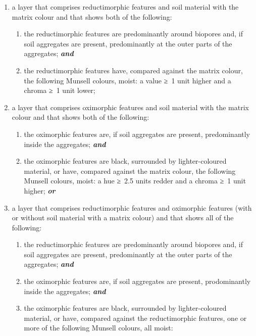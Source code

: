 \documentclass[
  letterpaper,
  DIV=11,
  numbers=noendperiod]{scrreprt}
\providecommand{\tightlist}{%
  \setlength{\itemsep}{0pt}\setlength{\parskip}{0pt}}\usepackage{longtable,booktabs,array}
\begin{document}
\begin{enumerate}
\def\labelenumi{\arabic{enumi}.}
\item
  a layer that comprises reductimorphic features and soil material with
  the matrix colour and that shows both of the following:

  \begin{enumerate}
  \def\labelenumii{\alph{enumii}.}
  \tightlist
  \item
    the reductimorphic features are predominantly around biopores and,
    if soil aggregates are present, predominantly at the outer parts of
    the aggregates; \textbf{\emph{and}}
  \item
    the reductimorphic features have, compared against the matrix
    colour, the following Munsell colours, moist: a value ≥~1 unit
    higher and a chroma ≥~1 unit lower;
  \end{enumerate}
\item
  a layer that comprises oximorphic features and soil material with the
  matrix colour and that shows both of the following:

  \begin{enumerate}
  \def\labelenumii{\alph{enumii}.}
  \tightlist
  \item
    the oximorphic features are, if soil aggregates are present,
    predominantly inside the aggregates; \textbf{\emph{and}}
  \item
    the oximorphic features are black, surrounded by lighter-coloured
    material, or have, compared against the matrix colour, the following
    Munsell colours, moist: a hue ≥~2.5 units redder and a chroma ≥~1
    unit higher; \textbf{\emph{or}}
  \end{enumerate}
\item
  a layer that comprises reductimorphic features and oximorphic features
  (with or without soil material with a matrix colour) and that shows
  all of the following:

  \begin{enumerate}
  \def\labelenumii{\alph{enumii}.}
  \tightlist
  \item
    the reductimorphic features are predominantly around biopores and,
    if soil aggregates are present, predominantly at the outer parts of
    the aggregates; \textbf{\emph{and}}
  \item
    the oximorphic features are, if soil aggregates are present,
    prodominantly inside the aggregates; \textbf{\emph{and}}
  \item
    the oximorphic features are black, surrounded by lighter-coloured
    material, or have, compared against the reductimorphic features, one
    or more of the following Munsell colours, all moist:


\end{enumerate}
\end{enumerate}
\end{document}
